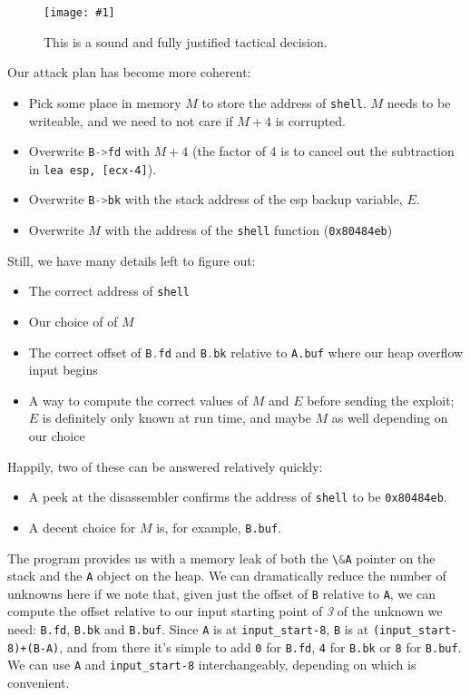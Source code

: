 \documentclass{article}
\newcommand{\displayimagecaphere}[2] {
    \begin{figure}[H]
    \centering
    \texttt{[image: \#1]} 
    \caption{#2}
\end{figure}
}
\newcommand{\xcode}[2]{\colorbox{ubuntuback}{\lstinline[language=#1]|#2|}}
\newcommand{\asm}[1]{\xcode{{[x86masm]assembler}}{#1}}
\newcommand{\code}[1]{\colorbox{ubuntuback}{\texttt{#1}}}
\begin{document}
\displayimagecaphere{./exercises/18_unlink/dog_chemistry_set.jpg}{This is a sound and fully justified tactical decision.}

Our attack plan has become more coherent:

\begin{itemize}
            \item Pick some place in memory $M$ to store the address of \code{shell}. $M$ needs to be writeable, and we need to not care if $M+4$ is corrupted.
            \item Overwrite \xcode{C}{B->fd} with $M+4$ (the factor of 4 is to cancel out the subtraction in \asm{lea esp, [ecx-4]}).
            \item Overwrite \xcode{C}{B->bk} with the stack address of the esp backup variable, $E$.
            \item Overwrite $M$ with the address of the \xcode{C}{shell} function (\code{0x80484eb})
\end{itemize}


Still, we have many details left to figure out:

\begin{itemize}
    \item The correct address of \xcode{C}{shell}
    \item Our choice of of $M$
    \item The correct offset of \xcode{C}{B.fd} and \xcode{C}{B.bk} relative to \code{A.buf} where our heap overflow input begins 
    \item A way to compute the correct values of $M$ and $E$ before sending the exploit; $E$ is definitely only known at run time, and maybe $M$ as well depending on our choice
\end{itemize}

Happily, two of these can be answered relatively quickly:
\begin{itemize}
    \item A peek at the disassembler confirms the address of \xcode{C}{shell} to be \code{0x80484eb}. 
    \item A decent choice for $M$ is, for example, \code{B.buf}. 
\end{itemize}

The program provides us with a memory leak of both the \xcode{C}{\&A} pointer on the stack and the \xcode{C}{A} object on the heap. We can dramatically reduce the number of unknowns here if we note that, given just the offset of \code{B} relative to \code{A}, we can compute the offset relative to our input starting point of \textit{3} of the unknown we need: \code{B.fd}, \code{B.bk} and \code{B.buf}. Since \code{A} is at \code{input\_start-8}, \code{B} is at \code{(input\_start-8)+(B-A)}, and from there it's simple to add \code{0} for \code{B.fd}, \code{4} for \code{B.bk} or \code{8} for \code{B.buf}. We can use \code{A} and \code{input\_start-8} interchangeably, depending on which is convenient.  
\end{document}
